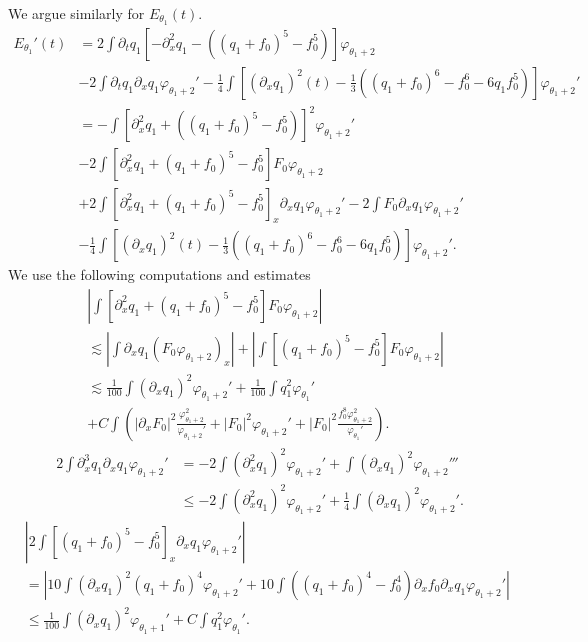 \documentclass[11pt,a4paper,reqno]{amsart}
\theoremstyle{remark}
\numberwithin{equation}{section}
\begin{document}
We argue similarly for $E_{\theta_1}(t)$. 
\begin{align*}
E_{\theta_1}'(t) & = 2 \int \partial_t q_1 \left[ - \partial_x^2 q_1 - \left((q_1+f_0)^5 - f_0^5\right)\right] \varphi_{\theta_1+2}\\
&  - 2 \int \partial_t q_1 \partial_x q_1 \varphi_{\theta_1+2}'
- \frac  14 \int\left[ (\partial_x q_1)^2(t) -\frac 13 \left( (q_1+f_0)^6 - f_0^6 - 6 q_1 f_0^5\right)   \right]\varphi_{\theta_1+2}'
\\ &= - \int \left[ \partial_x^2 q_1 + \left((q_1+f_0)^5 - f_0^5\right) \right]^2 \varphi_{\theta_1+2}'\\
& - 2 \int \left[ \partial_x^2 q_1 + (q_1 + f_0)^5 - f_0^5\right] F_0\varphi_{\theta_1+2}\\
& + 2 \int \left[ \partial_x^2 q_1 + (q_1 + f_0)^5 - f_0^5\right]_x \partial_x q_1 \varphi_{\theta_1+2}'
  - 2 \int F_0 \partial_x q_1 \varphi_{\theta_1+2}' 
\\ &- \frac  14 \int\left[ (\partial_x q_1)^2(t) -\frac 13 \left( (q_1+f_0)^6 - f_0^6 - 6 q_1 f_0^5\right)   \right]\varphi_{\theta_1+2}'.
\end{align*}
We use the following computations and estimates
\begin{align*}
&\left| \int \left[ \partial_x^2 q_1 + (q_1 + f_0)^5 - f_0^5\right] F_0\varphi_{\theta_1+2} \right| \\
& \lesssim 
\left|  \int \partial_x q_1 (F_0 \varphi_{\theta_1+2})_x \right| + \left| \int \left[  (q_1 + f_0)^5 - f_0^5\right] F_0\varphi_{\theta_1+2}\right| \\
& \lesssim \frac 1{100} \int   (\partial_x q_1)^2  \varphi_{\theta_1+2}'
+\frac 1{100} \int    q_1^2  \varphi_{\theta_1}'
\\ & + C \int \left(|\partial_x F_0|^2 \frac {\varphi_{\theta_1+2}^2}{\varphi_{\theta_1+2}'}
+ |F_0|^2 \varphi_{\theta_1+2}' + |F_0|^2 \frac {f_0^8 \varphi_{\theta_1+2}^2}{\varphi_{\theta_1}'}\right).
\end{align*}
\begin{align*}
2 \int \partial_x^3 q_1 \partial_x q_1 \varphi_{\theta_1+2}' 
& = - 2 \int (\partial_x^2 q_1)^2 \varphi_{\theta_1+2}' + \int (\partial_x q_1)^2 \varphi_{\theta_1+2}'''\\
& \leq - 2 \int (\partial_x^2 q_1)^2 \varphi_{\theta_1+2}' + \frac 14 \int (\partial_x q_1)^2 \varphi_{\theta_1+2}'.
\end{align*}
\begin{align*}
& \left| 2 \int \left[ (q_1+f_0)^5 - f_0^5\right]_x \partial_x q_1 \varphi_{\theta_1+2}' \right|\\
& =\left| 10 \int (\partial_x q_1)^2 (q_1+f_0)^4 \varphi_{\theta_1+2}'
+10 \int \left( (q_1+f_0)^4 - f_0^4\right) \partial_x f_0  \partial_x q_1 \varphi_{\theta_1+2}'\right|\\
& \leq \frac 1{100} \int (\partial_x q_1)^2 \varphi_{\theta_1+1}' + C \int q_1^2 \varphi_{\theta_1}'.
\end{align*}
\end{document}
